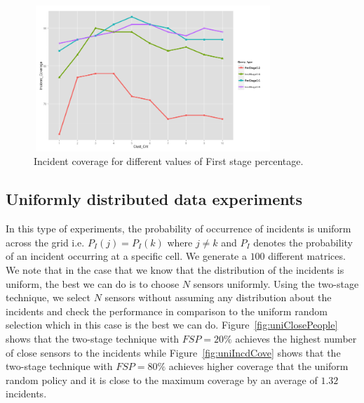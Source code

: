 \documentclass{acm_proc_article-sp}
\begin{document}
\begin{figure}[!h]
\centering
  \includegraphics[width=9cm ,height=5.5cm]{figuresPng/Coverage_Result.png}
  \caption{Incident coverage for different values of First stage percentage. }
  \label{fig: clustCoverage}
\end{figure}



\subsection{Uniformly distributed data experiments}
In this type of experiments, the probability of occurrence of incidents is uniform across the grid i.e. $P_I (j) = P_I (k)$ where $j \neq k$ and $P_I$ denotes the probability of an incident occurring at a specific cell. We generate a $100$ different matrices. We note that in the case that we know that the distribution of the incidents is uniform, the best we can do is to choose $N$ sensors uniformly. Using the two-stage technique, we select $N$ sensors without assuming any distribution about the incidents and check the performance in comparison to the uniform random selection which in this case is the best we can do. Figure~\ref{fig:uniClosePeople} shows that the two-stage technique with $FSP = 20\%$ achieves the highest number of close sensors to the incidents while Figure~\ref{fig:uniIncdCove} shows that the two-stage technique with $FSP = 80\%$ achieves higher coverage that the uniform random policy and it is close to the maximum coverage by an average of $1.32$ incidents.
\end{document}
